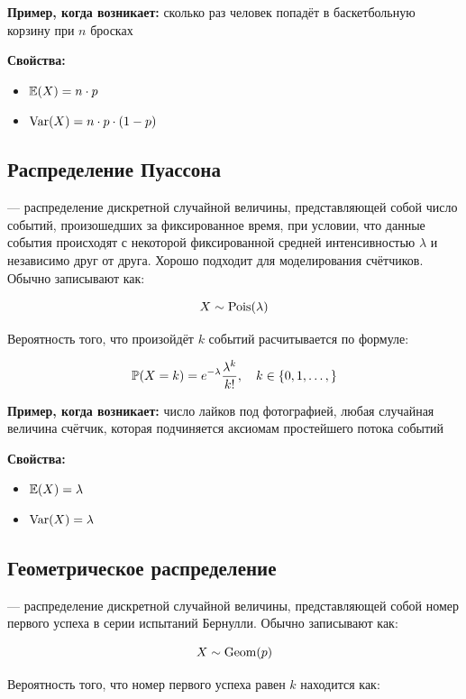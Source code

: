 \documentclass[12pt, a4paper, oneside]{article}
\begin{document}
\textbf{Пример, когда возникает:} сколько раз человек попадёт в баскетбольную корзину при $n$ бросках 

\textbf{Свойства:}

\begin{itemize} 
\item $\mathbb{E}(X) = n \cdot p$
\item $\operatorname{Var}(X) = n \cdot p \cdot (1 - p)$
\end{itemize} 


\subsection*{Распределение Пуассона}

 --- распределение дискретной случайной величины, представляющей собой число событий, произошедших за фиксированное время, при условии, что данные события происходят с некоторой фиксированной средней интенсивностью $\lambda$ и независимо друг от друга. Хорошо подходит для моделирования счётчиков. Обычно записывают как:

$$
X \sim \operatorname{Pois}(\lambda)
$$

Вероятность того, что произойдёт $k$ событий расчитывается по формуле: 

$$
\mathbb{P}(X = k) = e^{-\lambda} \dfrac{\lambda^k}{k!}, \quad k \in \{0, 1, \ldots, \}
$$

\textbf{Пример, когда возникает:} число лайков под фотографией, любая случайная величина счётчик, которая подчиняется аксиомам простейшего потока событий

\textbf{Свойства:}

\begin{itemize} 
\item $\mathbb{E}(X) = \lambda$
\item $\operatorname{Var}(X) = \lambda$
\end{itemize} 

\subsection*{Геометрическое распределение}

 --- распределение дискретной случайной величины, представляющей собой номер первого успеха в серии испытаний Бернулли. Обычно записывают как:

$$
X \sim \operatorname{Geom}(p)
$$

Вероятность того, что номер первого успеха равен $k$ находится как:
\end{document}
